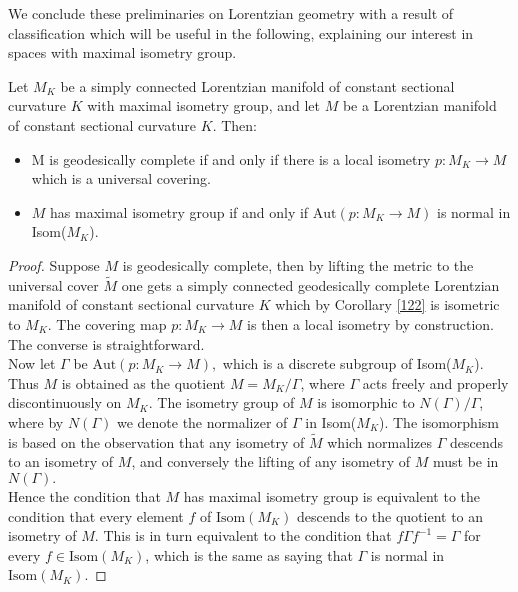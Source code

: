 We conclude these preliminaries on Lorentzian geometry with a result of classification which will be useful in the following, explaining our interest in spaces with maximal isometry group.
\begin{proposition}\label{classification}
    Let $M_K$ be a simply connected Lorentzian manifold of constant sectional curvature $K$ with maximal isometry group, and let $M$ be a Lorentzian manifold of constant sectional curvature $K$. Then: 
    \begin{itemize}
        \item M is geodesically complete if and only if there is a local isometry $p:M_K\to M$ which is a universal covering.
        \item $M$ has maximal isometry group if and only if $\text{Aut}(p:M_K\to M)$ is normal in Isom($M_K$). 
    \end{itemize}
\end{proposition}

\begin{proof}
    Suppose $M$ is geodesically complete, then by lifting the metric to the universal cover $\widetilde{M}$ one gets a simply connected geodesically complete Lorentzian manifold of constant sectional curvature $K$ which by Corollary \ref{122} is isometric to $M_K$. The covering map $p:M_K\to M$ is then a local isometry by construction. The converse is straightforward. \\   
    Now let $\Gamma$ be $\text{Aut}(p:M_K\to M),$ which is a discrete subgroup of Isom($M_K$). Thus $M$ is obtained as the quotient $M=M_{K}/\Gamma$, where $\Gamma$ acts freely and properly discontinuously on $M_K$. The isometry group of $M$ is isomorphic to $N(\Gamma)/\Gamma$, where by $N(\Gamma)$ we denote the normalizer of $\Gamma$ in Isom($M_K$). The isomorphism is based on the observation that any isometry of $\widetilde{M}$ which normalizes $\Gamma$ descends to an isometry of $M$, and conversely the lifting of any isometry of $M$ must be in $N(\Gamma).$\\
    Hence the condition that $M$ has maximal isometry group is equivalent to the condition that every element $f$ of $\text{Isom}(M_K)$ descends to the quotient to an isometry of $M$. This is in turn equivalent to the condition that $f\Gamma f^{-1}=\Gamma$ for every $f\in \text{Isom}(M_K)$, which is the same as saying that $\Gamma$ is normal in $\text{Isom}(M_K)$.
\end{proof}


